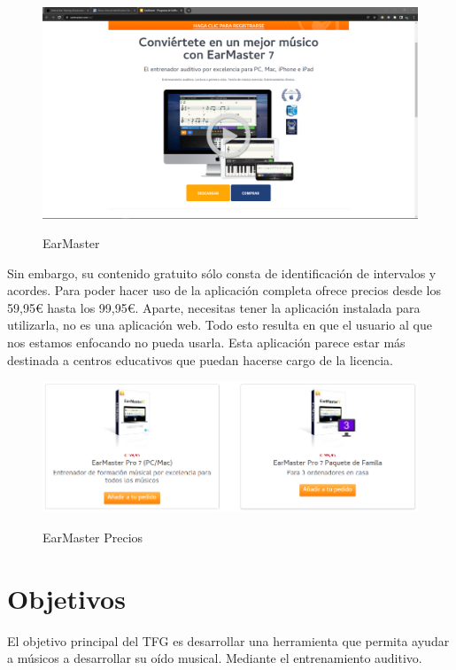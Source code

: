 \documentclass[12pt,twoside,titlepage]{report}
\begin{document}
\begin{figure}[H] 
    \includegraphics[scale=0.25]{Estado del Arte/earmaster}
    \centering
    \label{fig:earmaster}
    \caption{EarMaster}
\end{figure}

Sin embargo, su contenido gratuito sólo consta de identificación de intervalos y acordes. Para poder hacer uso de la aplicación completa ofrece precios desde los 59,95€ hasta los 99,95€. Aparte, necesitas tener la aplicación instalada para utilizarla, no es una aplicación web. Todo esto resulta en que el usuario al que nos estamos enfocando no pueda usarla. Esta aplicación parece estar más destinada a centros educativos que puedan hacerse cargo de la licencia.

\begin{figure}[H] 
    \includegraphics[scale=0.5]{Estado del Arte/earmasterprices}
    \centering
    \label{fig:earmasterprices}
    \caption{EarMaster Precios}
\end{figure}

\section{Objetivos}

El objetivo principal del TFG es desarrollar una herramienta que permita ayudar a músicos a desarrollar su oído musical. Mediante el entrenamiento auditivo.
\end{document}
